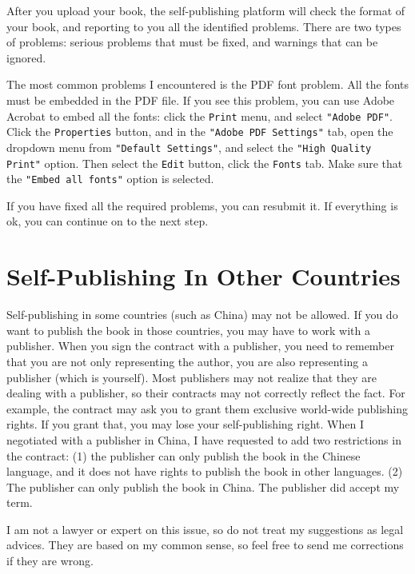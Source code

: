 After you upload your book, the self-publishing platform will check the format of your book,
and reporting to you all the identified problems. There are two types of problems: serious
problems that must be fixed, and warnings that can be ignored. 


The most common problems I encountered is the PDF font problem. All the fonts must be embedded in
the PDF file. If you see this problem, you can use Adobe Acrobat to embed all the fonts: click
the \texttt{Print} menu, and select \texttt{"Adobe PDF"}. Click the \texttt{Properties} button,
and in the \texttt{"Adobe PDF Settings"} tab, open the dropdown menu from
\texttt{"Default Settings"}, and select the \texttt{"High Quality Print"} option.
Then select the \texttt{Edit} button, click the \texttt{Fonts} tab. Make sure that 
the \texttt{"Embed all fonts"} option is selected.  


If you have fixed all the required problems, you can resubmit it. If everything is ok, you can
continue on to the next step. 




\section{Self-Publishing In Other Countries}

Self-publishing in some countries (such as China) may not be allowed.
If you do want to publish the book in those countries, you may have to 
work with a publisher. 
When you sign
the contract with a publisher, 
you need to remember that you are not only representing the author, 
you are also representing a
publisher (which is yourself). Most publishers may not realize that they 
are dealing with a publisher, so their contracts may not correctly reflect the fact. 
For example, the contract may ask you to grant them exclusive world-wide publishing rights. 
If you grant that, you may lose your self-publishing right.  
When I negotiated with a publisher in China, I have requested to add two restrictions in the 
contract: (1) the publisher can only publish the book in the Chinese language, 
and it does not have rights to publish the book in other languages. 
(2) The publisher can only publish the book in China. 
The publisher did accept my term. 


I am not a lawyer or expert on this issue, so do not treat my suggestions as 
legal advices. They are based on my common sense, so 
feel free to send me corrections if they are wrong. 






